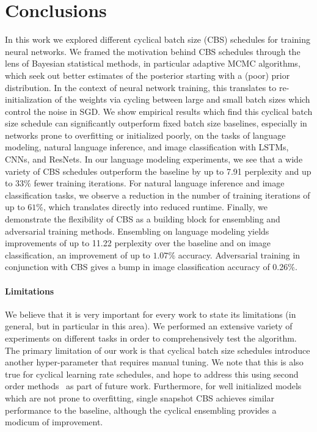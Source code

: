\section{Conclusions}\label{sec:conclusions}
In this work we explored different cyclical batch size (CBS) schedules for training neural networks. We framed the motivation behind CBS schedules through the lens of Bayesian statistical methods, in particular adaptive MCMC algorithms, which seek out better estimates of the
posterior starting with a (poor) prior distribution. In the context of neural network training, this translates to re-initialization of the weights via cycling between large and small batch sizes which control the noise in SGD. We show empirical results which find this cyclical batch size schedule can significantly outperform fixed batch size baselines, especially in networks prone to overfitting or initialized poorly, on the tasks of language modeling, natural language inference, and image classification with LSTMs, CNNs, and ResNets.
In our language modeling experiments, we see that a wide variety of CBS schedules outperform the baseline by up to 7.91 perplexity and up to $33\%$ fewer training iterations. For natural language inference and image classification tasks, we observe a reduction in the number of training iterations of up to $61\%$, which translates directly into reduced runtime. Finally, we demonstrate the flexibility of CBS as a building block for ensembling and adversarial training methods. Ensembling on language modeling yields improvements of up to 11.22 perplexity over the baseline and on image classification, an improvement of up to $1.07\%$ accuracy. Adversarial training in conjunction with CBS gives a bump in image classification accuracy of 0.26\%.

\paragraph{Limitations}
We believe that it is very important for every work to state its limitations (in 
general, but in particular in this area).
We performed an extensive variety of experiments on different tasks in order to comprehensively test the algorithm. 
The primary limitation of our work is that cyclical batch size schedules introduce another
hyper-parameter that requires manual tuning. We note that this is also true
for cyclical learning rate schedules, and hope to address this
using second order methods~\cite{yao2018large} as part of future work.
Furthermore, for well initialized models which are not prone to overfitting, single snapshot
CBS achieves similar performance to the baseline, although the cyclical ensembling provides a modicum of improvement.
